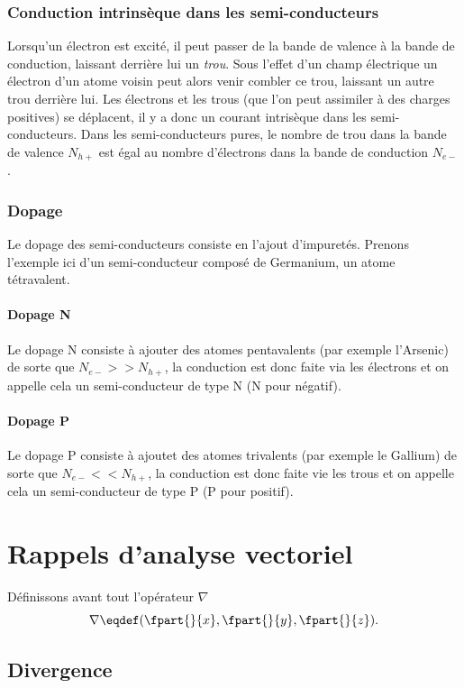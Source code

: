 \subsubsection{Conduction intrinsèque dans les semi-conducteurs}
Lorsqu'un électron est excité, il peut passer de la bande de valence
à la bande de conduction, laissant derrière lui un \emph{trou}.
Sous l'effet d'un champ électrique un électron d'un atome voisin 
peut alors venir combler ce trou, laissant un autre trou derrière lui. 
Les électrons et les trous (que l'on peut assimiler à des charges positives)
se déplacent, il y a donc un courant intrisèque dans les semi-conducteurs.
Dans les semi-conducteurs pures, le nombre de trou dans la bande de valence
$N_{h+}$ est égal au nombre d'électrons dans la bande de conduction $N_{e-}$.
\subsubsection{Dopage}
Le dopage des semi-conducteurs consiste en l'ajout d'impuretés.
Prenons l'exemple ici d'un semi-conducteur composé de Germanium,
un atome tétravalent.

\paragraph{Dopage N}
Le dopage N consiste à ajouter des atomes pentavalents
(par exemple l'Arsenic) de sorte que $N_{e-} >> N_{h+}$, 
la conduction est donc faite via les électrons et on appelle
cela un semi-conducteur de type N (N pour négatif).
\paragraph{Dopage P}
Le dopage P consiste à ajoutet des atomes trivalents
(par exemple le Gallium) de sorte que $N_{e-} << N_{h+}$,
la conduction est donc faite vie les trous et on appelle
cela un semi-conducteur de type P (P pour positif).

\appendix
\section{Rappels d'analyse vectoriel}
Définissons avant tout l'opérateur $\nabla$
\[ \nabla  \eqdef (\fpart{}{x}, \fpart{}{y}, \fpart{}{z}).\]
\subsection{Divergence}
